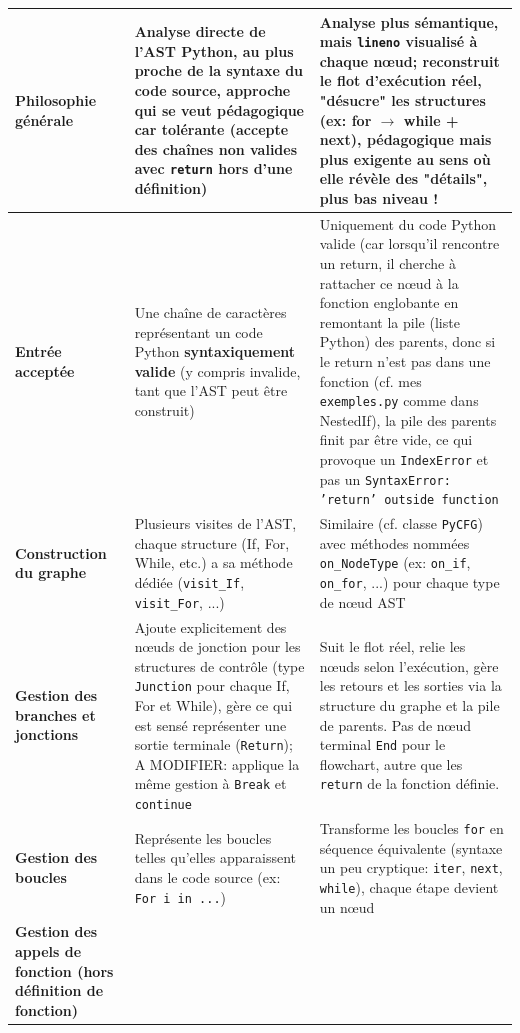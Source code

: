 \documentclass[11pt,a4paper]{article}
\begin{document}
\begin{longtable}{|p{3cm}|p{7cm}|p{6cm}|}
\textbf{Philosophie générale} & 
Analyse directe de l'AST Python, au plus proche de la syntaxe du code source, approche qui se veut pédagogique car tolérante (accepte des chaînes non valides avec \texttt{return} hors d'une définition) & 
Analyse plus sémantique, mais \texttt{lineno} visualisé à chaque nœud; reconstruit le flot d'exécution réel, "désucre" les structures (ex: for $\rightarrow$ while + next), pédagogique mais plus exigente au sens où elle révèle des "détails", plus bas niveau ! \\
\hline
\textbf{Entrée acceptée} & 
Une chaîne de caractères représentant un code Python \textbf{syntaxiquement valide} (y compris invalide, tant que l'AST peut être construit) & 
Uniquement du code Python valide (car lorsqu'il rencontre un return, il cherche à rattacher ce nœud à la fonction englobante en remontant la pile (liste Python) des parents, donc si le return n'est pas dans une fonction (cf. mes \texttt{exemples.py} comme dans NestedIf), la pile des parents finit par être vide, ce qui provoque un \texttt{IndexError} et pas un \texttt{SyntaxError: 'return' outside function}  \\
\hline
\textbf{Construction du graphe} & 
Plusieurs visites de l'AST, chaque structure (If, For, While, etc.) a sa méthode dédiée (\texttt{visit\_If}, \texttt{visit\_For}, ...) & 
Similaire (cf. classe \texttt{PyCFG}) avec  méthodes nommées \texttt{on\_NodeType} (ex: \texttt{on\_if}, \texttt{on\_for}, ...) pour chaque type de nœud AST \\
\hline
\textbf{Gestion des branches et jonctions} & 
Ajoute explicitement des nœuds de jonction pour les structures de contrôle (type \texttt{Junction} pour chaque If, For et While), gère ce qui est sensé représenter une sortie terminale (\texttt{Return}); A MODIFIER: applique la même gestion à \texttt{Break} et \texttt{continue} & 
Suit le flot réel, relie les nœuds selon l'exécution, gère les retours et les sorties via la structure du graphe et la pile de parents. Pas de nœud terminal \texttt{End} pour le flowchart, autre que les \texttt{return} de la fonction définie. \\
\hline
\textbf{Gestion des boucles} & 
Représente les boucles telles qu'elles apparaissent dans le code source (ex: \texttt{For i in ...}) & 
Transforme les boucles \texttt{for} en séquence équivalente (syntaxe un peu cryptique: \texttt{iter}, \texttt{next}, \texttt{while}), chaque étape devient un nœud \\
\hline
\textbf{Gestion des appels de fonction (hors définition de fonction)} & 

\end{longtable}
\end{document}
